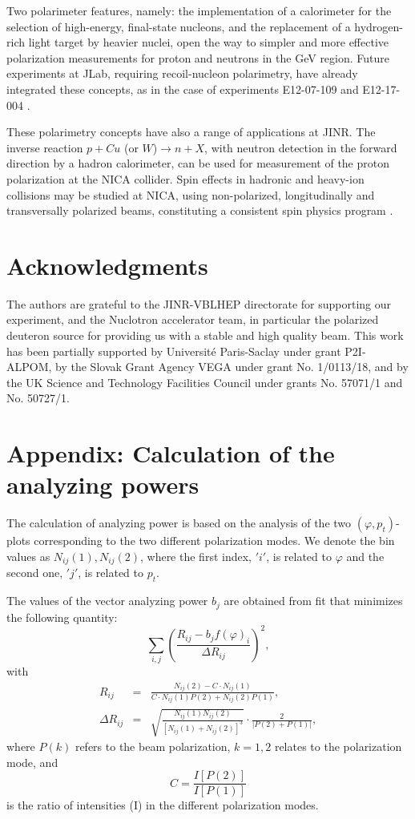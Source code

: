 \documentclass[twocolumn,epjc3]{svjour3}
\begin{document}
Two polarimeter features, namely: the implementation of a calorimeter for the selection of high-energy, final-state nucleons, and the replacement of a hydrogen-rich light target by heavier nuclei, open the way to simpler and more effective polarization measurements for proton and neutrons in the GeV region.  Future experiments at JLab, requiring recoil-nucleon polarimetry, have already integrated these concepts, as in the case of experiments E12-07-109 \cite{PR12-07-109} and E12-17-004 \cite{PR12-17-004}.

These polarimetry concepts have also a range of applications at JINR. The inverse reaction $p+Cu$ (or $W$)$\to n+X$, with neutron detection in the forward direction by a hadron calorimeter, can be used for measurement of the proton polarization at the NICA collider. Spin effects in hadronic and heavy-ion collisions may be studied at NICA, using non-polarized, longitudinally and transversally polarized beams, constituting a consistent spin physics program \cite{Savin:2016arw}.

\section{Acknowledgments}
The authors are grateful to the JINR-VBLHEP directorate for supporting our experiment, and the Nuclotron accelerator team, in particular the polarized deuteron source for providing us with a stable and high quality beam. This work has been partially supported by Universit\'e Paris-Saclay under grant P2I-ALPOM, by the Slovak Grant Agency VEGA under grant No. 1/0113/18, and by the UK Science and Technology Facilities Council under grants No. 57071/1 and No. 50727/1.

\section{Appendix: Calculation of the analyzing powers}
The calculation of analyzing power is based on the analysis of the two $(\varphi,p_t)$-plots corresponding to the two different polarization modes. We denote the bin values as $N_{ij}(1),N_{ij}(2)$, where the first index, $'i'$, is related to $\varphi$ and the second one, $'j'$, is related to $p_t$.

The values of the vector analyzing power $b_j$ are obtained from fit that minimizes the following quantity:
\begin{equation}\label{anpwv}
  \sum_{i,j} \left(\frac{R_{ij}-b_jf(\varphi)_i}{\Delta R_{ij}}\right)^2,
\end{equation}
with
\begin{eqnarray}
  \label{Rij}
  R_{ij} &=& \frac{N_{ij}(2)-C\cdot N_{ij}(1)}
             {C\cdot N_{ij}(1)P(2)+N_{ij}(2)P(1)},\\
  \Delta R_{ij} &=& \sqrt{\frac{N_{ij}(1)N_{ij}(2)}{[N_{ij}(1)+N_{ij}(2)]^3}}\cdot\frac{2}{|P(2)+P(1)|},
\end{eqnarray}
where $P(k)$ refers to the beam polarization, $k=1,2$ relates to the polarization mode, and
$$C=\frac{I[P(2)]}{I[P(1)]}$$
is the ratio of intensities (I) in the different polarization modes.
\end{document}
